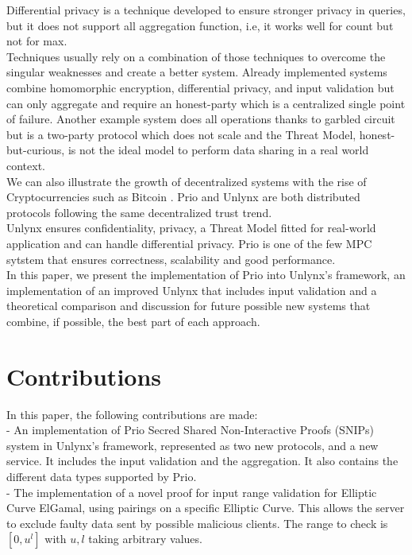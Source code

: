 \documentclass{article}
\begin{document}
Differential privacy is a technique developed to ensure stronger privacy in queries, but it does not support all aggregation function, i.e, it works well for count but not for max.\\
Techniques usually rely on a combination of those techniques to overcome the singular weaknesses and create a better system. Already implemented systems \cite{ref1} combine homomorphic encryption, differential privacy, and input validation but can only aggregate and require an honest-party which is a centralized single point of failure. Another example system \cite{ref2} does all operations thanks to garbled circuit but is a two-party protocol which does not scale and the Threat Model, honest-but-curious, is not the ideal model to perform data sharing in a real world context.\\
We can also illustrate the growth of decentralized systems with the rise of Cryptocurrencies such as Bitcoin \cite{bitcoin}. Prio and Unlynx are both distributed protocols following the same decentralized trust trend.\\
Unlynx ensures confidentiality, privacy, a Threat Model fitted for real-world application and can handle differential privacy. Prio is one of the few MPC sytstem that ensures correctness, scalability and good performance.\\
In this paper, we present the implementation of Prio into Unlynx's framework, an implementation of an improved Unlynx that includes input validation and a theoretical comparison and discussion for future possible new systems that combine, if possible, the best part of each approach.
	
\section*{Contributions}
In this paper, the following contributions are made:\\
- An implementation of Prio Secred Shared Non-Interactive Proofs (SNIPs) system in Unlynx's framework, represented as two new protocols, and a new service. It includes the input validation and the aggregation. It also contains the different data types supported by Prio.\\

- The implementation of a novel proof for input range validation for Elliptic Curve ElGamal, using pairings on a specific Elliptic Curve. This allows the server to exclude faulty data sent by possible malicious clients. The range to check is $[0,u^l]$ with $u,l$ taking arbitrary values.\\
\end{document}
